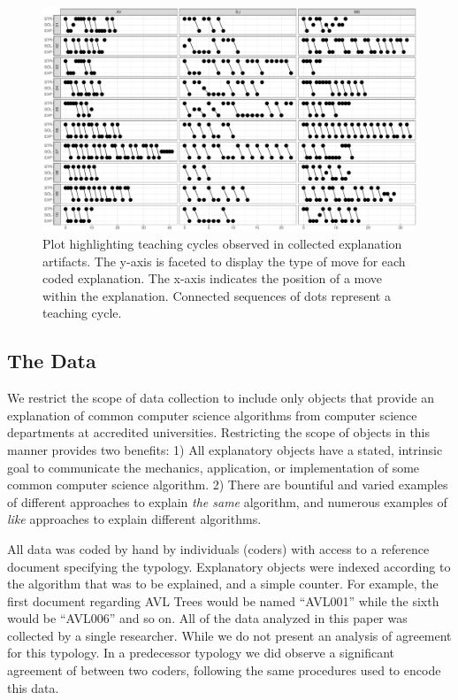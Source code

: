 \documentclass[conference]{IEEEtran}
\begin{document}
\begin{figure}
\centering
\includegraphics[width=\textwidth]{teachCyclesPltCombined}
\caption{Plot highlighting teaching cycles observed in collected explanation
artifacts. The y-axis is faceted to display the type of move for each coded
explanation. The x-axis indicates the position of a move within the
explanation. Connected sequences of dots represent a teaching cycle.}
\label{fig:cycles-plot}
\end{figure}

\subsection{The Data}
We restrict the scope of data collection to include only objects that provide an
explanation of common computer science algorithms from computer
science departments at accredited universities. Restricting the scope of objects
in this manner provides two benefits: 1) All explanatory objects have a stated,
intrinsic goal to communicate the mechanics, application, or implementation of
some common computer science algorithm. 2) There are bountiful and varied
examples of different approaches to explain \emph{the same} algorithm, and numerous
examples of \emph{like} approaches to explain different algorithms.

All data was coded by hand by individuals (coders) with access to a reference
document specifying the typology. Explanatory objects were indexed according to
the algorithm that was to be explained, and a simple counter. For example, the
first document regarding AVL Trees would be named ``AVL001'' while the sixth
would be ``AVL006'' and so on. All of the data analyzed in this paper was
collected by a single researcher. While we do not present an analysis of
agreement for this typology. In a predecessor typology we did observe a
significant agreement of  between two coders,
following the same procedures used to encode this data.
\end{document}
